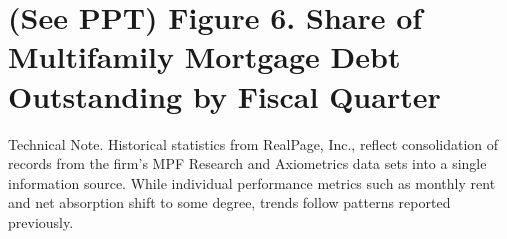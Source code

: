 \documentclass{article}
\begin{document}
\bigskip

\section*{\normalsize (See PPT) Figure 6. Share of Multifamily Mortgage Debt Outstanding by Fiscal Quarter}

\bigskip

\hline

\smallskip

\small{Technical Note. Historical statistics from RealPage, Inc., reflect consolidation of records from the firm’s MPF Research and Axiometrics data sets into a single information source. While individual performance metrics such as monthly rent and net absorption shift to some degree, trends follow patterns reported previously.}
\end{document}
